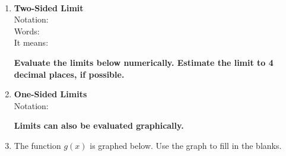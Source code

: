 \documentclass[11pt,fleqn]{article}
\begin{document}
\renewcommand{\headrulewidth}{0pt}
\newcommand{\blank}[1]{\rule{#1}{0.75pt}}
\newcommand{\bc}{\begin{center}}
\newcommand{\ec}{\end{center}}
\renewcommand{\d}{\displaystyle}

\vspace*{-0.7in}

\begin{center}
  \\
\end{center}
\begin{enumerate}
\item {} \textbf{Two-Sided Limit}\\

Notation: \\

Words: \\

It means: \\
\vspace{0.5in}

\noindent\textbf{Evaluate the limits below numerically. Estimate the limit to 4 decimal places, if possible.}\\
\vfill

\vfill

\newpage
\item {} \textbf{One-Sided Limits}\\

Notation: \\

 
 \vspace{2in}
 

\textbf{Limits can also be evaluated graphically.}\\
\item The function $g(x)$ is graphed below. Use the graph to fill in the blanks.


\end{enumerate}
\end{document}

